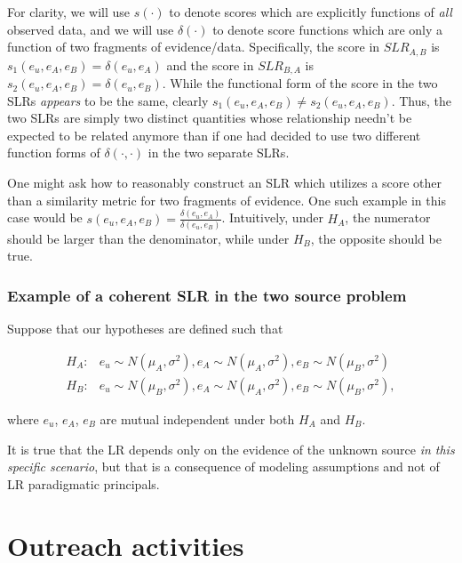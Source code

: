 \documentclass[]{book}
\begin{document}
For clarity, we will use \(s(\cdot)\) to denote scores which are explicitly functions of \emph{all} observed data, and we will use \(\delta (\cdot)\) to denote score functions which are only a function of two fragments of evidence/data. Specifically, the score in \(SLR_{A,B}\) is \(s_1(e_u,e_A,e_B) = \delta(e_u,e_A)\) and the score in \(SLR_{B,A}\) is \(s_2(e_u,e_A,e_B) = \delta(e_u,e_B)\). While the functional form of the score in the two SLRs \emph{appears} to be the same, clearly \(s_1(e_u,e_A,e_B) \neq s_2(e_u,e_A,e_B)\). Thus, the two SLRs are simply two distinct quantities whose relationship needn't be expected to be related anymore than if one had decided to use two different function forms of \(\delta(\cdot,\cdot)\) in the two separate SLRs.

One might ask how to reasonably construct an SLR which utilizes a score other than a similarity metric for two fragments of evidence. One such example in this case would be \(s(e_u, e_A, e_B) = \frac{\delta(e_u,e_A)}{\delta(e_u,e_B)}\). Intuitively, under \(H_A\), the numerator should be larger than the denominator, while under \(H_B\), the opposite should be true.

\hypertarget{example-of-a-coherent-slr-in-the-two-source-problem}{%
\subsection{Example of a coherent SLR in the two source problem}\label{example-of-a-coherent-slr-in-the-two-source-problem}}

Suppose that our hypotheses are defined such that

\[
\begin{array}{cc}
H_A: & e_u \sim N(\mu_A, \sigma^2), e_A \sim N(\mu_A, \sigma^2), e_B \sim N(\mu_B, \sigma^2) \\
H_B: & e_u \sim N(\mu_B, \sigma^2), e_A \sim N(\mu_A, \sigma^2), e_B \sim N(\mu_B, \sigma^2),
\end{array}
\]

where \(e_u\), \(e_A\), \(e_B\) are mutual independent under both \(H_A\) and \(H_B\).

It is true that the LR depends only on the evidence of the unknown source \emph{in this specific scenario}, but that is a consequence of modeling assumptions and not of LR paradigmatic principals.

\hypertarget{outreach-activities}{%
\chapter{Outreach activities}\label{outreach-activities}}
\end{document}
